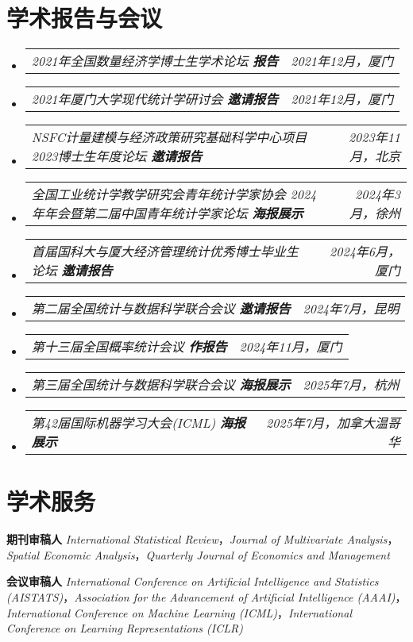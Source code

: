\documentclass[letterpaper,10pt]{article}
\makeatletter
\newcommand{\resumeSubSubheading}[2]{
    \item
    \begin{tabular*}{0.97\textwidth}{l@{\extracolsep{\fill}}r}
      \textit{\small#1} & \textit{\small #2} \\
    \end{tabular*}\vspace{-7pt}
}
\newcommand{\resumeSubHeadingListStart}{\begin{itemize}[leftmargin=0.15in, label={}]}
\newcommand{\resumeSubHeadingListEnd}{\end{itemize}}
\makeatother
\begin{document}
\section{学术报告与会议}
\resumeSubHeadingListStart
    \resumeSubSubheading
        {{2021年全国数量经济学博士生学术论坛} \textbf{报告}}{2021年12月，厦门}
    \resumeSubSubheading
        {{2021年厦门大学现代统计学研讨会} \textbf{邀请报告}}{2021年12月，厦门}
    \resumeSubSubheading
        {{NSFC计量建模与经济政策研究基础科学中心项目2023博士生年度论坛} \textbf{邀请报告}}{2023年11月，北京}
    \resumeSubSubheading
        {{全国工业统计学教学研究会青年统计学家协会 2024 年年会暨第二届中国青年统计学家论坛} \textbf{海报展示}}{2024年3月，徐州}
    \resumeSubSubheading
        {{首届国科大与厦大经济管理统计优秀博士毕业生论坛} \textbf{邀请报告}}{2024年6月，厦门}
    \resumeSubSubheading
        {{第二届全国统计与数据科学联合会议} \textbf{邀请报告}}{2024年7月，昆明}
    \resumeSubSubheading
        {{第十三届全国概率统计会议} \textbf{作报告}}{2024年11月，厦门}
    \resumeSubSubheading
        {{第三届全国统计与数据科学联合会议} \textbf{海报展示}}{2025年7月，杭州}
    \resumeSubSubheading
        {{第42届国际机器学习大会(ICML)} \textbf{海报展示}}{2025年7月，加拿大温哥华}
\resumeSubHeadingListEnd


  \section{学术服务}
  \begin{itemize}[leftmargin=0.15in, label={}]
    \small{
    \item \textbf{期刊审稿人} \textit{International Statistical Review}，\textit{Journal of Multivariate Analysis}，\textit{Spatial Economic Analysis}，\textit{Quarterly Journal of Economics and Management}
    \item \textbf{会议审稿人} \textit{International Conference on Artificial Intelligence and Statistics (AISTATS)}，\textit{Association for the Advancement of Artificial Intelligence (AAAI)}，\textit{International Conference on Machine Learning (ICML)}，\textit{International Conference on Learning Representations (ICLR)}
    }
  \end{itemize}
\end{document}
